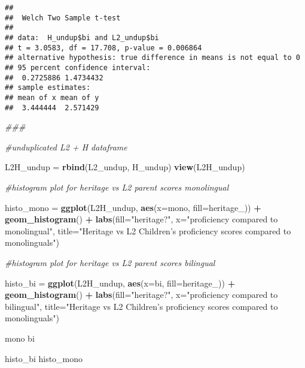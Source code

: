 \documentclass[
]{article}
\newenvironment{Shaded}{\begin{snugshade}}{\end{snugshade}}
\newcommand{\CommentTok}[1]{\textcolor[rgb]{0.56,0.35,0.01}{\textit{#1}}}
\newcommand{\DataTypeTok}[1]{\textcolor[rgb]{0.13,0.29,0.53}{#1}}
\newcommand{\KeywordTok}[1]{\textcolor[rgb]{0.13,0.29,0.53}{\textbf{#1}}}
\newcommand{\NormalTok}[1]{#1}
\newcommand{\OperatorTok}[1]{\textcolor[rgb]{0.81,0.36,0.00}{\textbf{#1}}}
\newcommand{\StringTok}[1]{\textcolor[rgb]{0.31,0.60,0.02}{#1}}
\begin{document}
\begin{Shaded}
\end{Shaded}

\begin{verbatim}
## 
##  Welch Two Sample t-test
## 
## data:  H_undup$bi and L2_undup$bi
## t = 3.0583, df = 17.708, p-value = 0.006864
## alternative hypothesis: true difference in means is not equal to 0
## 95 percent confidence interval:
##  0.2725886 1.4734432
## sample estimates:
## mean of x mean of y 
##  3.444444  2.571429
\end{verbatim}

\begin{Shaded}
\begin{Highlighting}[]
\CommentTok{###}

\CommentTok{#unduplicated L2 + H dataframe}

\NormalTok{L2H_undup =}\StringTok{ }\KeywordTok{rbind}\NormalTok{(L2_undup, H_undup)}
\KeywordTok{view}\NormalTok{(L2H_undup)}

\CommentTok{#histogram plot for heritage vs L2 parent scores monolingual}

\NormalTok{histo_mono =}\StringTok{ }\KeywordTok{ggplot}\NormalTok{(L2H_undup, }\KeywordTok{aes}\NormalTok{(}\DataTypeTok{x=}\NormalTok{mono, }\DataTypeTok{fill=}\NormalTok{heritage_)) }\OperatorTok{+}
\StringTok{  }\KeywordTok{geom_histogram}\NormalTok{() }\OperatorTok{+}
\StringTok{  }\KeywordTok{labs}\NormalTok{(}\DataTypeTok{fill=}\StringTok{"heritage?"}\NormalTok{, }\DataTypeTok{x=}\StringTok{"proficiency compared to monolingual"}\NormalTok{, }\DataTypeTok{title=}\StringTok{"Heritage vs L2 Children's proficiency scores compared to monolinguals"}\NormalTok{)}

\CommentTok{#histogram plot for heritage vs L2 parent scores bilingual}

\NormalTok{histo_bi =}\StringTok{ }\KeywordTok{ggplot}\NormalTok{(L2H_undup, }\KeywordTok{aes}\NormalTok{(}\DataTypeTok{x=}\NormalTok{bi, }\DataTypeTok{fill=}\NormalTok{heritage_)) }\OperatorTok{+}
\StringTok{  }\KeywordTok{geom_histogram}\NormalTok{() }\OperatorTok{+}
\StringTok{  }\KeywordTok{labs}\NormalTok{(}\DataTypeTok{fill=}\StringTok{"heritage?"}\NormalTok{, }\DataTypeTok{x=}\StringTok{"proficiency compared to bilingual"}\NormalTok{, }\DataTypeTok{title=}\StringTok{"Heritage vs L2 Children's proficiency scores compared to monolinguals"}\NormalTok{)}
\end{Highlighting}
\end{Shaded}

mono bi

histo\_bi histo\_mono
\end{document}
